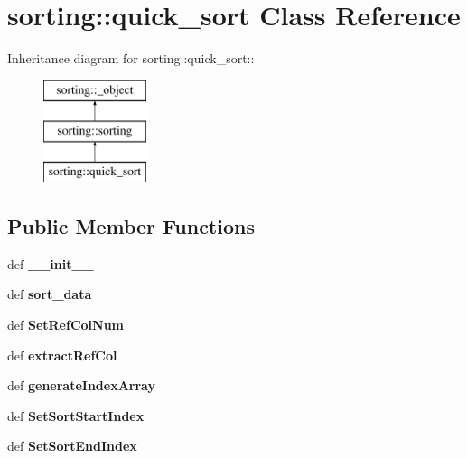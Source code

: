 \hypertarget{classsorting_1_1quick__sort}{
\section{sorting::quick\_\-sort Class Reference}
\label{d4/d5e/classsorting_1_1quick__sort}
}
Inheritance diagram for sorting::quick\_\-sort::\begin{figure}[H]
\begin{center}
\leavevmode
\includegraphics[height=3cm]{d4/d5e/classsorting_1_1quick__sort}
\end{center}
\end{figure}
\subsection*{Public Member Functions}
\begin{DoxyCompactItemize}
\item 
\hypertarget{classsorting_1_1quick__sort_ae0f00c84f6dfd40c9462542c4fa0db00}{
def {\bfseries \_\-\_\-init\_\-\_\-}}
\label{d4/d5e/classsorting_1_1quick__sort_ae0f00c84f6dfd40c9462542c4fa0db00}

\item 
\hypertarget{classsorting_1_1quick__sort_af6c83879e74a1ab8de2131338c116302}{
def {\bfseries sort\_\-data}}
\label{d4/d5e/classsorting_1_1quick__sort_af6c83879e74a1ab8de2131338c116302}

\item 
\hypertarget{classsorting_1_1quick__sort_ae247da359c93731ebb3e21efc5085bcd}{
def {\bfseries SetRefColNum}}
\label{d4/d5e/classsorting_1_1quick__sort_ae247da359c93731ebb3e21efc5085bcd}

\item 
\hypertarget{classsorting_1_1quick__sort_a97acd05702e686bd10dfd2e197f1dd2f}{
def {\bfseries extractRefCol}}
\label{d4/d5e/classsorting_1_1quick__sort_a97acd05702e686bd10dfd2e197f1dd2f}

\item 
\hypertarget{classsorting_1_1quick__sort_a46f58959a8e21a44c9662731b2468a30}{
def {\bfseries generateIndexArray}}
\label{d4/d5e/classsorting_1_1quick__sort_a46f58959a8e21a44c9662731b2468a30}

\item 
\hypertarget{classsorting_1_1quick__sort_a361060bf03d79a2e317f887498e07983}{
def {\bfseries SetSortStartIndex}}
\label{d4/d5e/classsorting_1_1quick__sort_a361060bf03d79a2e317f887498e07983}

\item 
\hypertarget{classsorting_1_1quick__sort_a64cd132577db12ed3f8763226c173d5c}{
def {\bfseries SetSortEndIndex}}
\label{d4/d5e/classsorting_1_1quick__sort_a64cd132577db12ed3f8763226c173d5c}

\end{DoxyCompactItemize}
